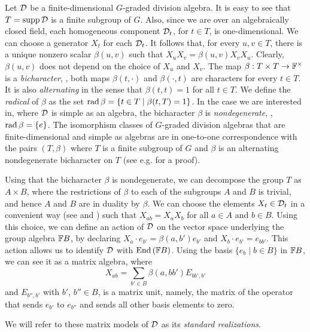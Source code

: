 Let $\mathcal{D}$ be a finite-dimensional $G$-graded division algebra. It is easy to see that $T= \operatorname{supp} \mathcal{D}$ is a finite subgroup of $G$. 
Also, since we are over an algebraically closed field, each homogeneous component $\mathcal{D}_t$, for $t\in T$, is one-dimensional. We can choose a generator $X_t$ for each $\mathcal{D}_t$. It follows that, for every $u,v\in T$, there is a unique nonzero scalar $\beta (u,v)$ such that $X_u X_v = \beta (u,v) X_v X_u$. Clearly, $\beta (u,v)$ does not depend on the choice of $X_u$ and $X_v$.
The map $\beta: T\times T \rightarrow \mathbb{F}^{\times}$ is a \emph{bicharacter}, \ie, both maps $\beta(t,\cdot)$ and $\beta(\cdot,t)$ are characters for every $t \in T$. It is also \emph{alternating} in the sense that $\beta (t,t) = 1$ for all $t\in T$. We define the \emph{radical} of $\beta$ as the set $\operatorname{rad} \beta = \{ t\in T \mid \beta(t, T) = 1 \}$. In the case we are interested in, where $\mathcal{D}$ is simple as an algebra, the bicharacter $\beta$ is \emph{nondegenerate}, \ie, $\operatorname{rad} \beta = \{e\} $. The isomorphism classes of $G$-graded division algebras that are finite-dimensional and simple as algebras are in one-to-one correspondence with the pairs $(T,\beta)$ where $T$ is a finite subgroup of $G$ and $\beta$ is an alternating nondegenerate bicharacter on $T$ (see e.g. \cite[Section 2.2]{livromicha} for a proof).

Using that the bicharacter $\beta$ is nondegenerate, we can decompose the group $T$ as $A\times B$, where the restrictions of $\beta$ to each of the subgroups $A$ and $B$ is trivial, and hence $A$ and $B$ are in duality by $\beta$. We can choose the elements $X_t\in \mathcal{D}_t$ in a convenient way (see \cite[Remark 2.16]{livromicha} and 
\cite[Remark 18]{EK15}) such that $X_{ab}=X_aX_b$ for all $a\in A$ and $b\in B$. Using this choice, we can define an action of $\mathcal{D}$ on the vector space underlying the group algebra $\mathbb{F} B$, by declaring $X_a\cdot e_{b'} = \beta(a, b') e_{b'}$ and $X_b\cdot e_{b'} = e_{bb'}$. 
This action allows us to identify $\mathcal{D}$ with $\operatorname{End}{(\mathbb{F} B)}$. Using the basis $\{e_{b}\mid b\in B\}$ in $\mathbb{F} B$, we can see it as a matrix algebra, where
%
\[X_{ab}= \sum_{b'\in B} \beta(a, bb') E_{bb', b'}\]
%
and $E_{b'', b'}$ with $b'$, $b'' \in B$, is a matrix unit, namely, the matrix of the operator that sends $e_{b'}$ to $e_{b''}$ and sends all other basis elements to zero.

\begin{defi}
	We will refer to these matrix models of $\mathcal D$ as its \emph{standard realizations}.
\end{defi}

